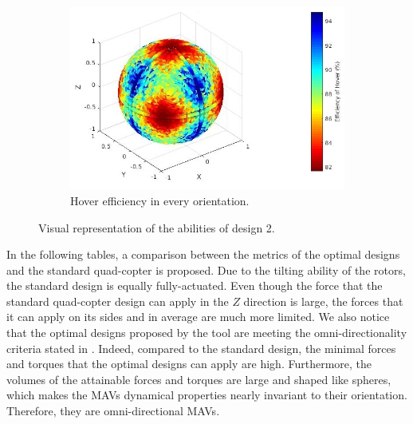 \begin{figure}[!ht]
\begin{center}
\begin{subfigure}[b]{0.45\textwidth}
    \includegraphics[width=\linewidth]{images/Quad_design_1_hspace.jpg}
    \caption{Hover efficiency in every orientation.} \label{fig:deisgn2_hspace}
  \end{subfigure}
  \caption{Visual representation of the abilities of design 2.}
  \label{fig:Quadcopter2_spaces}
  \end{center}
\end{figure}

In the following tables, a comparison between the metrics of the optimal designs
and the standard quad-copter is proposed. Due to the tilting ability of the rotors,
the standard design is equally fully-actuated. Even though the force that the standard
quad-copter design can apply in the $Z$ direction is large, the forces that it can
apply on its sides and in average are much more limited. We also notice that the
optimal designs proposed by the tool are meeting the omni-directionality
criteria stated in . Indeed, compared to the standard
design, the minimal forces and torques that the optimal designs can apply are high.
Furthermore, the volumes of the attainable forces and torques are large and shaped
like spheres, which makes the MAVs dynamical properties nearly invariant to their
orientation. Therefore, they are omni-directional MAVs.

\begin{table}[!ht]
\begin{center}
 \caption{Information on the designs’ force space properties.}\vspace{1ex}
 \label{tab:tab_Quad_compare_force}
\end{center}
\end{table}

